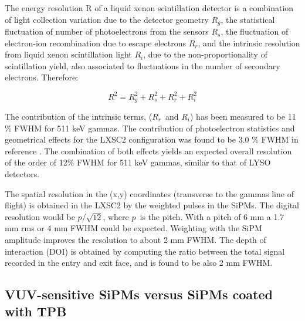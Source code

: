 \documentclass[review]{elsarticle}
\begin{document}
The energy resolution R of a liquid xenon scintillation detector is a combination of light collection variation due to the detector geometry $R_g$, the statistical fluctuation of number of photoelectrons from the sensors $R_s$, the fluctuation of electron-ion recombination due to escape electrons $R_r$, and the intrinsic resolution from liquid xenon scintillation light $R_i$, due to the non-proportionality of scintillation yield, also associated to fluctuations in the number of secondary electrons. Therefore:

\begin{equation}
R^2 = R_g^2 + R_s^2 + R_r^2 + R_i^2
\end{equation}

The contribution of the intrinsic terms, ($R_r$~and $R_i$) has been measured to be 11 \% FWHM \cite{aprileRes} for 511 keV gammas. The contribution of photoelectron statistics and geometrical effects for the LXSC2 configuration was found to be 3.0 \% FWHM
in reference \cite{Petalo2015}. The combination of both effects yields an expected 
overall resolution of the order of 12\% FWHM for 511 keV gammas, similar to that of LYSO detectors. 

The spatial resolution in the (x,y) coordinates (transverse to the gammas line of flight) is obtained in the LXSC2 by the weighted pulses in the SiPMs. The digital resolution would be
$p/\sqrt{12}$, where $p$~is the pitch. With a pitch of 6 mm a 1.7 mm rms or 4 mm FWHM could be expected. Weighting with the SiPM amplitude improves the resolution to about 2 mm FWHM. The depth of interaction (DOI) is obtained by computing the ratio between the
total signal recorded in the entry and exit face, and is found to be also 2 mm FWHM. 

\subsection*{VUV-sensitive SiPMs versus SiPMs coated with TPB}
\end{document}
